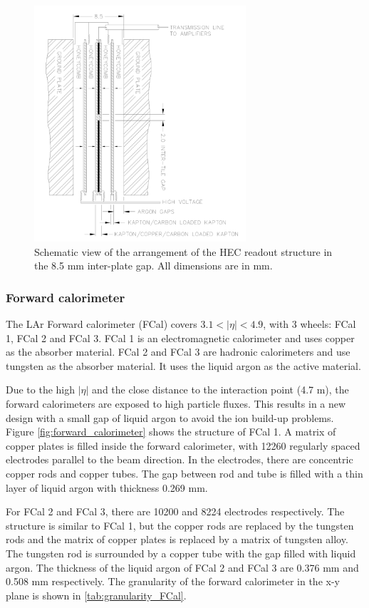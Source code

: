 \begin{figure}
\centering
\includegraphics[width=0.7\textwidth]{data/photo/detector/HEC.png}
\caption{Schematic view of the arrangement of the HEC readout structure in the 8.5 mm inter-plate gap. All dimensions are in mm. \cite{ATLAS_doc}}
\label{fig:HEC}
\end{figure}

\subsubsection{Forward calorimeter}
The LAr Forward calorimeter (FCal) covers $3.1<|\eta|<4.9$, with 3 wheels: FCal 1, FCal 2 and FCal 3.
FCal 1 is an electromagnetic calorimeter and uses copper as the absorber material.
FCal 2 and FCal 3 are hadronic calorimeters and use tungsten as the absorber material.
It uses the liquid argon as the active material.

Due to the high $|\eta|$ and the close distance to the interaction point (4.7 m), the forward calorimeters are exposed to high particle fluxes.
This results in a new design with a small gap of liquid argon to avoid the ion build-up problems.
Figure \ref{fig:forward_calorimeter} shows the structure of FCal 1.
A matrix of copper plates is filled inside the forward calorimeter, with 12260 regularly spaced electrodes parallel to the beam direction.
In the electrodes, there are concentric copper rods and copper tubes.
The gap between rod and tube is filled with a thin layer of liquid argon with thickness 0.269 mm.

For FCal 2 and FCal 3, there are 10200 and 8224 electrodes respectively.
The structure is similar to FCal 1, but the copper rods are replaced by the tungsten rods and the matrix of copper plates is replaced by a matrix of tungsten alloy.
The tungsten rod is surrounded by a copper tube with the gap filled with liquid argon.
The thickness of the liquid argon of FCal 2 and FCal 3 are 0.376 mm and 0.508 mm respectively.
The granularity of the forward calorimeter in the x-y plane is shown in \ref{tab:granularity_FCal}.

